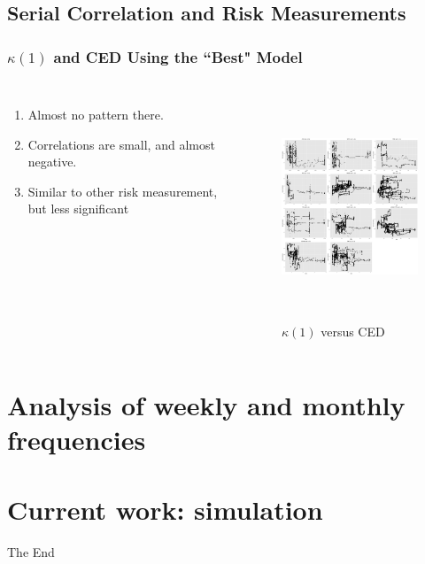 \documentclass{beamer}
\newcommand\Fontviii{\fontsize{8}{9.2}\selectfont}
\begin{document}
\subsection{Serial Correlation and Risk Measurements}
\begin{frame}
\frametitle{$\kappa(1)$ and CED Using the ``Best" Model}
\Fontviii
\begin{columns}[c]
\begin{enumerate}
\item Almost no pattern there.
\item Correlations are small, and almost negative.
\item Similar to other risk measurement, but less significant
\end{enumerate}
 
 
\begin{figure}[h]
\centering 
\includegraphics[width=6cm,height = 6cm]{../figures/SerCol-CED3mon2yr}
\label{fig:SerCol-CED3mon2yr}
\caption{$\kappa(1)$ versus CED}
\end{figure}

\end{columns}
\end{frame}
\section{Analysis of weekly and monthly frequencies}

\section{Current work: simulation}



\begin{frame}
\Huge{\centerline{The End}}
\end{frame}

\end{document}
